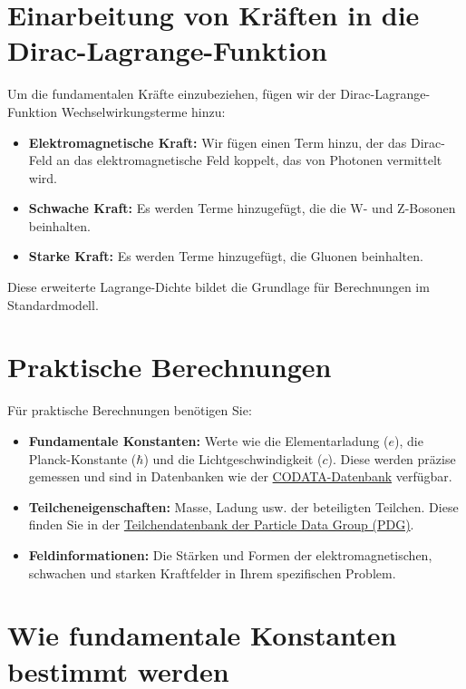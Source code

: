 \documentclass{article}
\begin{document}
	\section{Einarbeitung von Kräften in die Dirac-Lagrange-Funktion}
	
	Um die fundamentalen Kräfte einzubeziehen, fügen wir der Dirac-Lagrange-Funktion Wechselwirkungsterme hinzu:
	
	\begin{itemize}
		\item \textbf{Elektromagnetische Kraft:} Wir fügen einen Term hinzu, der das Dirac-Feld an das elektromagnetische Feld koppelt, das von Photonen vermittelt wird.
		\item \textbf{Schwache Kraft:} Es werden Terme hinzugefügt, die die W- und Z-Bosonen beinhalten.
		\item \textbf{Starke Kraft:} Es werden Terme hinzugefügt, die Gluonen beinhalten.
	\end{itemize}
	
	Diese erweiterte Lagrange-Dichte bildet die Grundlage für Berechnungen im Standardmodell.
	
	\section{Praktische Berechnungen}
	
	Für praktische Berechnungen benötigen Sie:
	
	\begin{itemize}
		\item \textbf{Fundamentale Konstanten:} Werte wie die Elementarladung ($e$), die Planck-Konstante ($\hbar$) und die Lichtgeschwindigkeit ($c$). Diese werden präzise gemessen und sind in Datenbanken wie der \href{https://physics.nist.gov/cuu/Constants/index.html}{CODATA-Datenbank} verfügbar.
		\item \textbf{Teilcheneigenschaften:} Masse, Ladung usw. der beteiligten Teilchen. Diese finden Sie in der \href{http://pdg.lbl.gov/}{Teilchendatenbank der Particle Data Group (PDG)}.
		\item \textbf{Feldinformationen:} Die Stärken und Formen der elektromagnetischen, schwachen und starken Kraftfelder in Ihrem spezifischen Problem.
	\end{itemize}
	
	\section{Wie fundamentale Konstanten bestimmt werden}
	
\end{document}
